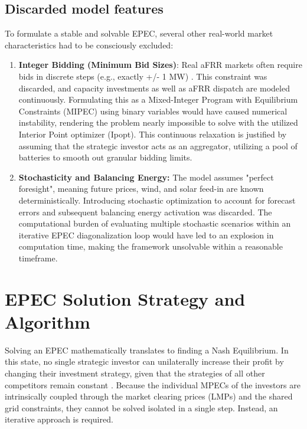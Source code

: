 \subsection{Discarded model features} \label{subsect:Discarded_features}
To formulate a stable and solvable EPEC, several other real-world market characteristics had to be consciously excluded:
\begin{enumerate}
    \item \textbf{Integer Bidding (Minimum Bid Sizes)}: Real aFRR markets often require bids in discrete steps (e.g., exactly +/- 1 MW) \cite{apg_secondary_control}. This constraint was discarded, and capacity investments as well as aFRR dispatch are modeled continuously. Formulating this as a Mixed-Integer Program with Equilibrium Constraints (MIPEC) using binary variables would have caused numerical instability, rendering the problem nearly impossible to solve with the utilized Interior Point optimizer (Ipopt). This continuous relaxation is justified by assuming that the strategic investor acts as an aggregator, utilizing a pool of batteries to smooth out granular bidding limits.
    \item \textbf{Stochasticity and Balancing Energy:} The model assumes "perfect foresight", meaning future prices, wind, and solar feed-in are known deterministically. Introducing stochastic optimization to account for forecast errors and subsequent balancing energy activation was discarded. The computational burden of evaluating multiple stochastic scenarios within an iterative EPEC diagonalization loop would have led to an explosion in computation time, making the framework unsolvable within a reasonable timeframe.
\end{enumerate}

\section{EPEC Solution Strategy and Algorithm} \label{sect:EPEC_Solution_Strategy}
Solving an EPEC mathematically translates to finding a Nash Equilibrium. In this state, no single strategic investor can unilaterally increase their profit by changing their investment strategy, given that the strategies of all other competitors remain constant \cite{conejo_complementarity_2020}. Because the individual MPECs of the investors are intrinsically coupled through the market clearing prices (LMPs) and the shared grid constraints, they cannot be solved isolated in a single step. Instead, an iterative approach is required.


